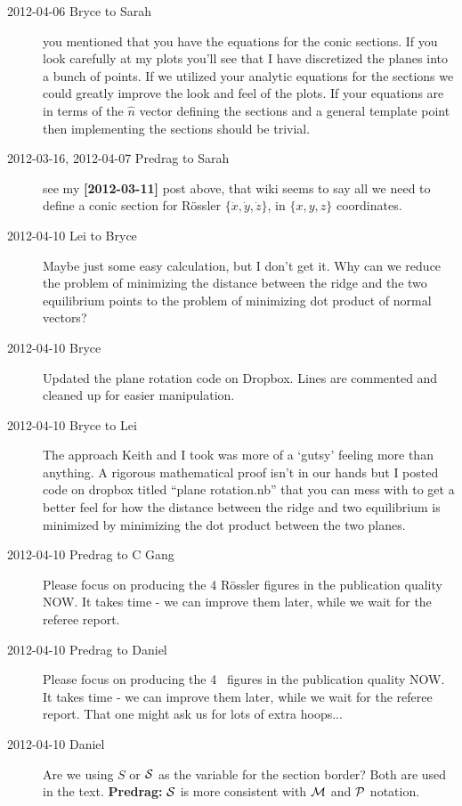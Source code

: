 \begin{description}
\item[2012-04-06 Bryce to Sarah]
you mentioned that you have the equations for the conic sections.
If you look carefully at my plots you'll see that I have discretized the
planes into a bunch of points. If we utilized  your analytic equations
for the sections we could greatly improve the look and feel of the plots.
If your equations are in terms of the $\hat{n}$ vector defining the
sections and a general template point then implementing the sections
should be trivial.

\item[2012-03-16, 2012-04-07 Predrag to Sarah] see my {\bf [2012-03-11]}
post above, that wiki seems to say all we need to define a conic section
for R\"ossler $\{\dot{x},\dot{y},\dot{z}\}$, in $\{x,y,z\}$ coordinates.


\item[2012-04-10 Lei to Bryce] Maybe just some easy calculation, but I
don't get it. Why can we reduce the problem of minimizing the distance
between the ridge and the two equilibrium points to the problem of
minimizing dot product of normal vectors?

\item[2012-04-10 Bryce] Updated the plane rotation code on Dropbox. Lines
are commented and cleaned up for easier manipulation.

\item[2012-04-10 Bryce to Lei] The approach Keith and I took was more of
a `gutsy' feeling more than anything. A rigorous mathematical proof
isn't in our hands but I posted code on dropbox titled ``plane
rotation.nb'' that you can mess with to get a better feel for how the
distance between the ridge and two equilibrium is minimized by minimizing
the dot product between the two planes.

\item[2012-04-10 Predrag to C Gang]
Please focus on producing the 4 R\"ossler figures in the publication quality NOW.
It takes time - we can improve them later, while we wait for the referee report.

\item[2012-04-10 Predrag to Daniel]
Please focus on producing the 4 \cLe\ figures in the publication quality NOW.
It takes time - we can improve them later, while we wait for the referee report.
That one might ask us for lots of extra hoops...

\item[2012-04-10 Daniel] Are we using $S$ or ${\cal S}$ as the variable
for the section border? Both are used in the text.
{\bf Predrag:} ${\cal S}$ is more consistent with ${\cal M}$ and ${\cal P}$
notation.


\end{description}
